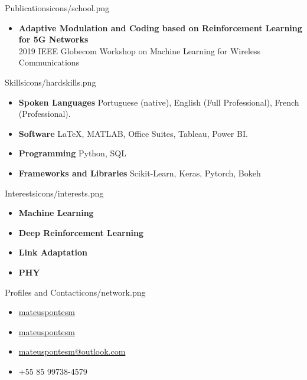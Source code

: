 \documentclass{thepurplecv}
\begin{document}
\begin{purplesectionleft}{Publications}{icons/school.png}
{
\begin{itemize}[leftmargin=0cm,align=left]
    \item[] \textbf{Adaptive Modulation and Coding based on Reinforcement Learning for 5G Networks}\\
    2019 IEEE Globecom Workshop on Machine Learning for Wireless Communications
\end{itemize}
}
\end{purplesectionleft}

\begin{purplesectionright}{Skills}{icons/hardskills.png}
{
\begin{itemize}[leftmargin=0cm,align=left]
    \item[] \textbf{Spoken Languages}
    Portuguese (native), English (Full Professional), French (Professional).

    \item[] \textbf{Software}
    \LaTeX, MATLAB, Office Suites, Tableau, Power BI.

    \item[] \textbf{Programming}
    Python, SQL

    \item[] \textbf{Frameworks and Libraries}
    Scikit-Learn, Keras, Pytorch, Bokeh

\end{itemize}
}
\end{purplesectionright}

\begin{purplesectionleft}{Interests}{icons/interests.png}
{
\begin{itemize}[leftmargin=0cm,align=left]
    \item[] \textbf{Machine Learning}
    \item[] \textbf{Deep Reinforcement Learning}
    \item[] \textbf{Link Adaptation}
    \item[] \textbf{PHY}
\end{itemize}
}
\end{purplesectionleft}

\begin{purplesectionright}{Profiles and Contact}{icons/network.png}
{
\begin{itemize}[leftmargin=0cm,align=left]
\item[] \faGithub \hspace*{10pt} \href{https://github.com/mateuspontesm/}{mateuspontesm}
\item[] \faLinkedin \hspace*{10pt} \href{https://www.linkedin.com/in/mateuspontesm/}{mateuspontesm}
\item[] \faEnvelope \hspace*{10pt} \href{mateuspontesm@outlook.com}{mateuspontesm@outlook.com}
\item[] \faPhone \hspace*{10pt} +55 85 99738-4579
\end{itemize}
}
\end{purplesectionright}

\end{document}
